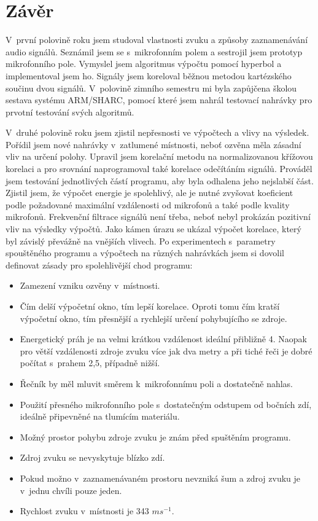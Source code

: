 \chapter{Závěr}

V~první polovině roku jsem studoval vlastnosti zvuku a způsoby zaznamenávání audio signálů. Seznámil jsem se s~mikrofonním polem a sestrojil jsem prototyp mikrofonního pole. Vymyslel jsem algoritmus výpočtu pomocí hyperbol a implementoval jsem ho. Signály jsem koreloval běžnou metodou kartézského součinu dvou signálů. V~polovině zimního semestru mi byla zapůjčena školou sestava systému ARM/SHARC, pomocí které jsem nahrál testovací nahrávky pro prvotní testování svých algoritmů.

V~druhé polovině roku jsem zjistil nepřesnosti ve výpočtech a vlivy na výsledek. Pořídil jsem nové nahrávky v~zatlumené místnosti, neboť ozvěna měla zásadní vliv na určení polohy. Upravil jsem korelační metodu na normalizovanou křížovou korelaci a pro srovnání naprogramoval také korelace odečítáním signálů. Prováděl jsem testování jednotlivých částí programu, aby byla odhalena jeho nejslabší část. Zjistil jsem, že výpočet energie je spolehlivý, ale je nutné zvyšovat koeficient podle požadované maximální vzdálenosti od mikrofonů a také podle kvality mikrofonů. Frekvenční filtrace signálů není třeba, neboť nebyl prokázán pozitivní vliv na výsledky výpočtů. Jako kámen úrazu se ukázal výpočet korelace, který byl závislý převážně na vnějších vlivech. Po experimentech s~parametry spouštěného programu a výpočtech na různých nahrávkách jsem si dovolil definovat zásady pro spolehlivější chod programu:

\begin{itemize}
  \item Zamezení vzniku ozvěny v~místnosti.
  \item Čím delší výpočetní okno, tím lepší korelace. Oproti tomu čím kratší výpočetní okno, tím přesnější a rychlejší určení pohybujícího se zdroje.
  \item Energetický práh je na velmi krátkou vzdálenost ideální přibližně 4. Naopak pro větší vzdálenosti zdroje zvuku více jak dva metry a při tiché řeči je dobré počítat s~prahem 2,5, případně nižší.
  \item Řečník by měl mluvit směrem k~mikrofonnímu poli a dostatečně nahlas.
  \item Použití přesného mikrofonního pole s~dostatečným odstupem od bočních zdí, ideálně připevněné na tlumícím materiálu.
  \item Možný prostor pohybu zdroje zvuku je znám před spuštěním programu.
  \item Zdroj zvuku se nevyskytuje blízko zdí.
  \item Pokud možno v~zaznamenávaném prostoru nevzniká šum a zdroj zvuku je v~jednu chvíli pouze jeden.
  \item Rychlost zvuku v~místnosti je 343 $ms^{-1}$.
\end{itemize}

